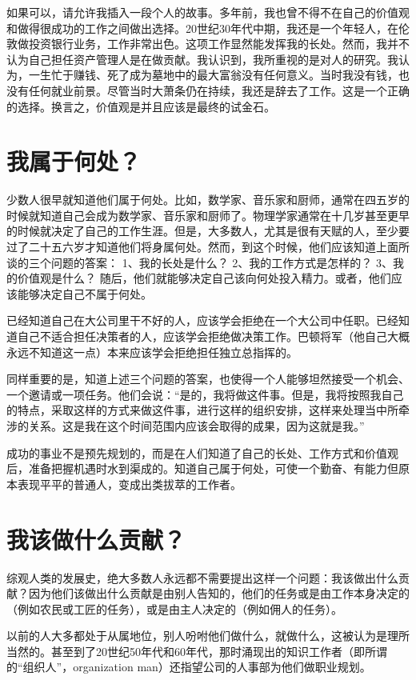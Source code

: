 \documentclass[a4paper,12pt,lang=cn,fontset = windows]{elegantpaper} %
\begin{document}
如果可以，请允许我插入一段个人的故事。多年前，我也曾不得不在自己的价值观和做得很成功的工作之间做出选择。20世纪30年代中期，我还是一个年轻人，在伦敦做投资银行业务，工作非常出色。这项工作显然能发挥我的长处。然而，我并不认为自己担任资产管理人是在做贡献。我认识到，我所重视的是对人的研究。我认为，一生忙于赚钱、死了成为墓地中的最大富翁没有任何意义。当时我没有钱，也没有任何就业前景。尽管当时大萧条仍在持续，我还是辞去了工作。这是一个正确的选择。换言之，价值观是并且应该是最终的试金石。

\section{我属于何处？}
少数人很早就知道他们属于何处。比如，数学家、音乐家和厨师，通常在四五岁的时候就知道自己会成为数学家、音乐家和厨师了。物理学家通常在十几岁甚至更早的时候就决定了自己的工作生涯。但是，大多数人，尤其是很有天赋的人，至少要过了二十五六岁才知道他们将身属何处。然而，到这个时候，他们应该知道上面所谈的三个问题的答案：
1、我的长处是什么？
2、我的工作方式是怎样的？
3、我的价值观是什么？
随后，他们就能够决定自己该向何处投入精力。或者，他们应该能够决定自己不属于何处。

已经知道自己在大公司里干不好的人，应该学会拒绝在一个大公司中任职。已经知道自己不适合担任决策者的人，应该学会拒绝做决策工作。巴顿将军（他自己大概永远不知道这一点）本来应该学会拒绝担任独立总指挥的。

同样重要的是，知道上述三个问题的答案，也使得一个人能够坦然接受一个机会、一个邀请或一项任务。他们会说：“是的，我将做这件事。但是，我将按照我自己的特点，采取这样的方式来做这件事，进行这样的组织安排，这样来处理当中所牵涉的关系。这是我在这个时间范围内应该会取得的成果，因为这就是我。”

成功的事业不是预先规划的，而是在人们知道了自己的长处、工作方式和价值观后，准备把握机遇时水到渠成的。知道自己属于何处，可使一个勤奋、有能力但原本表现平平的普通人，变成出类拔萃的工作者。

\section{我该做什么贡献？}
综观人类的发展史，绝大多数人永远都不需要提出这样一个问题：我该做出什么贡献？因为他们该做出什么贡献是由别人告知的，他们的任务或是由工作本身决定的（例如农民或工匠的任务），或是由主人决定的（例如佣人的任务）。

以前的人大多都处于从属地位，别人吩咐他们做什么，就做什么，这被认为是理所当然的。甚至到了20世纪50年代和60年代，那时涌现出的知识工作者（即所谓的“组织人”，organization man）还指望公司的人事部为他们做职业规划。
\end{document}

